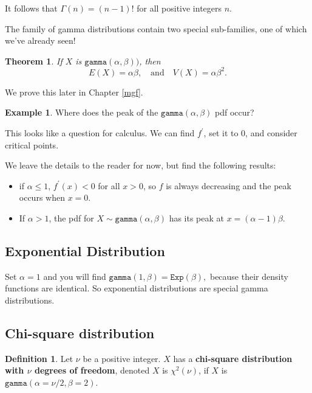 \documentclass[
]{book}
\providecommand{\tightlist}{%
  \setlength{\itemsep}{0pt}\setlength{\parskip}{0pt}}
\newtheorem{theorem}{Theorem}[chapter]
\theoremstyle{definition}
\newtheorem{definition}{Definition}[chapter]
\theoremstyle{definition}
\newtheorem{example}{Example}[chapter]
\theoremstyle{definition}
\theoremstyle{definition}
\theoremstyle{remark}
\begin{document}
It follows that \(\Gamma(n) = (n-1)!\) for all positive integers \(n\).

The family of gamma distributions contain two special sub-families, one of which we've already seen!

\begin{theorem}
\protect\hypertarget{thm:gamma-EandV}{}\label{thm:gamma-EandV}If \(X\) is \(\texttt{gamma}(\alpha,\beta))\), then \[E(X) = \alpha\beta, ~~~ \text{ and } ~~~ V(X) = \alpha\beta^2.\]
\end{theorem}

We prove this later in Chapter \ref{mgf}.

\begin{example}

Where does the peak of the \(\texttt{gamma}(\alpha,\beta)\) pdf occur?

This looks like a question for calculus. We can find \(f^\prime\), set it to 0, and consider critical points.

We leave the details to the reader for now, but find the following results:

\begin{itemize}
\tightlist
\item
  if \(\alpha \leq 1\), \(f^\prime(x) < 0\) for all \(x > 0\), so \(f\) is always decreasing and the peak occurs when \(x = 0\).
\item
  If \(\alpha > 1\), the pdf for \(X \sim \texttt{gamma}(\alpha, \beta)\) has its peak at \(x = (\alpha-1)\beta.\)
\end{itemize}

\end{example}

\subsection{Exponential Distribution}\label{exponential-distribution-1}

Set \(\alpha = 1\) and you will find \(\texttt{gamma}(1,\beta) = \texttt{Exp}(\beta),\)
because their density functions are identical. So exponential distributions are special gamma distributions.

\subsection{Chi-square distribution}\label{chi-square-distribution}

\begin{definition}
\protect\hypertarget{def:chi-square}{}\label{def:chi-square}Let \(\nu\) be a positive integer. \(X\) has a \textbf{chi-square distribution with \(\nu\) degrees of freedom}, denoted \(X\) is \(\chi^2(\nu)\), if \(X\) is \(\texttt{gamma}(\alpha = \nu/2, \beta = 2).\)
\end{definition}
\end{document}
